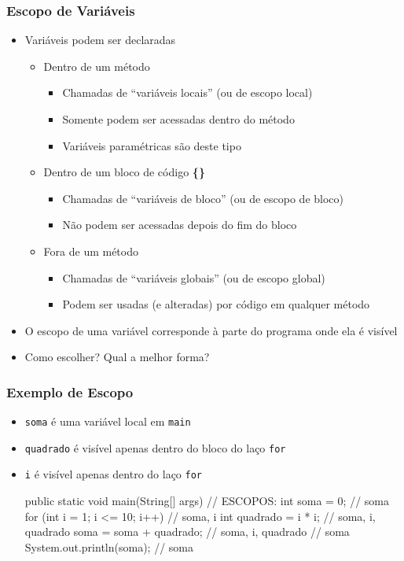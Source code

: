 \documentclass[xcolor={dvipsnames,table},aspectratio=169]{beamer}
\begin{document}
\begin{frame}\frametitle{Escopo de Variáveis}
\begin{itemize}
	\item Variáveis podem ser declaradas
	\begin{itemize}
		\item Dentro de um método
		\begin{itemize}
			\item Chamadas de ``variáveis locais'' (ou de escopo local)
			\item Somente podem ser acessadas dentro do método
			\item Variáveis paramétricas são deste tipo
		\end{itemize}
		\item Dentro de um bloco de código \textbf{\{\}}
		\begin{itemize}
			\item Chamadas de ``variáveis de bloco'' (ou de escopo de bloco)
			\item Não podem ser acessadas depois do fim do bloco
		\end{itemize}
		\item Fora de um método
		\begin{itemize}
			\item Chamadas de ``variáveis globais'' (ou de escopo global)
			\item Podem ser usadas (e alteradas) por código em qualquer método
		\end{itemize}
	\end{itemize}
	\item O escopo de uma variável corresponde à parte do programa onde ela é visível
	\item Como escolher? Qual a melhor forma?
\end{itemize}
\end{frame}

\begin{frame}[fragile]\frametitle{Exemplo de Escopo}
\begin{itemize}
	\item \texttt{soma} é uma variável local em \texttt{main}
	\item \texttt{quadrado} é visível apenas dentro do bloco do laço \texttt{for}
	\item \texttt{i} é visível apenas dentro do laço \texttt{for}
\begin{javacode}
public static void main(String[] args) { // ESCOPOS:
  int soma = 0;                          // soma
  for (int i = 1; i <= 10; i++)  {       // soma, i
    int quadrado = i * i;                // soma, i, quadrado
    soma = soma + quadrado;              // soma, i, quadrado
  }                                      // soma
  System.out.println(soma);              // soma
}
\end{javacode}
\end{itemize}
\end{frame}
\end{document}
